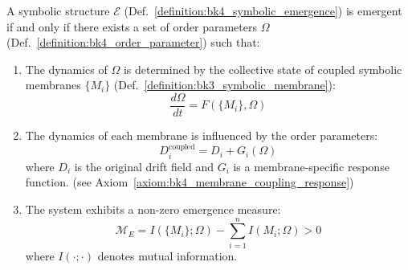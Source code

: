 \begin{theorem}
\label{theorem:bk4_emergence_criterion}
A symbolic structure $\mathcal{E}$ (Def.~\ref{definition:bk4_symbolic_emergence}) is emergent if and only if there exists a set of order parameters $\Omega$ (Def.~\ref{definition:bk4_order_parameter}) such that:
\begin{enumerate}
    \item The dynamics of $\Omega$ is determined by the collective state of coupled symbolic membranes $\{M_i\}$ (Def.~\ref{definition:bk3_symbolic_membrane}):
    \begin{equation}
        \frac{d\Omega}{dt} = F(\{M_i\}, \Omega)
    \end{equation}
    \item The dynamics of each membrane is influenced by the order parameters:
    \begin{equation}
        D_i^{\text{coupled}} = D_i + G_i(\Omega)
    \end{equation}
    where $D_i$ is the original drift field and $G_i$ is a membrane-specific response function.  (see Axiom~\ref{axiom:bk4_membrane_coupling_response})
    \item The system exhibits a non-zero emergence measure:
    \begin{equation}
        \mathcal{M}_E = I(\{M_i\}; \Omega) - \sum_{i=1}^{n} I(M_i; \Omega) > 0
    \end{equation}
    where $I(\cdot;\cdot)$ denotes mutual information.
\end{enumerate}
\end{theorem}
